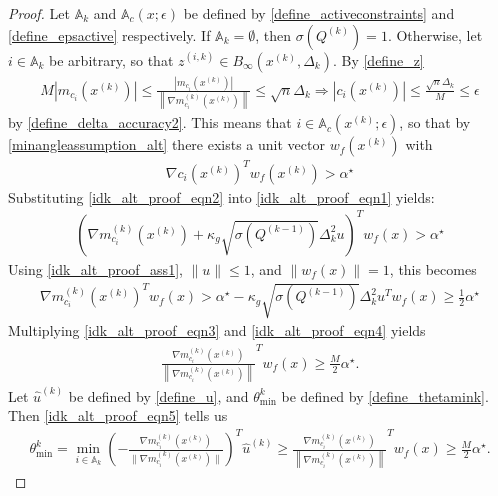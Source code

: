 \documentclass{article}
\theoremstyle{case}
\numberwithin{theorem}{subsection}
\DeclareMathOperator*{\argmin}{arg\,min}
\newcommand{\activeconstraintsk}{{\mathbb A_{k}}}
\newcommand{\dacc}{{\Delta_{\textrm{acc}}}}
\newcommand{\dk}{\Delta_k}
\newcommand{\gmcik}{{\nabla m_{c_i}^{(k)}\left(\xk\right)}}
\newcommand{\hgik}{{\frac{\nabla m^{(k)}_{c_i}(\xk)}{\|\nabla m^{(k)}_{c_i}(\xk)\|}}}
\newcommand{\huk}{{{\hat u}^{(k)}}}
\newcommand{\minanglealpha}{{ \alpha^{\star} }}
\newcommand{\qk}{{Q^{(k)}}}
\newcommand{\thetamink}{{\theta^k_{\textrm{min}}}}
\newcommand{\tr}{{ B_{\infty}\left(\xk, \dk\right) }}
\newcommand{\xk}{{x^{(k)}}}
\newcommand{\zik}{{z^{(i, k)}}}
\newcommand{\minanglediralt}{{w_f}}
\newcommand{\epsactive}{{\mathbb A_c}}
\newcommand{\epsactivemodels}{{\mathbb A_{m}}}
\begin{document}
\begin{proof}
Let $\activeconstraintsk$ and $\epsactive(x; \epsilon)$
be defined by
\cref{define_activeconstraints} and \cref{define_epsactive}
respectively.
If $\activeconstraintsk = \emptyset$, then $\sigma\left(\qk\right) = 1$.
Otherwise, let $i \in \activeconstraintsk$ be arbitrary,
so that $\zik \in \tr$. By \cref{define_z}
\begin{align*}
M \left|m_{c_i}\left(\xk\right)\right| \le \frac{\left|m_{c_i}\left(\xk\right)\right|}{\left\|\gmcik\right\|} \le \sqrt{n} \dk \Longrightarrow
\left|c_i\left(\xk\right)\right| \le \frac{\sqrt{n}\dk}{M} \le \epsilon
\end{align*}
by \cref{define_delta_accuracy2}.
This means that $i \in \epsactive(\xk; \epsilon)$, so that by \cref{minangleassumption_alt} there exists a unit vector $\minanglediralt(\xk)$ with
\begin{align}
\nabla c_i\left(\xk\right)^T\minanglediralt\left(\xk\right) > \minanglealpha \label{idk_alt_proof_eqn1}
\end{align}
Substituting \cref{idk_alt_proof_eqn2} into \cref{idk_alt_proof_eqn1} yields:
\begin{align*}
\left(\gmcik + \kappa_g \sqrt{\sigma\left( Q^{(k-1)} \right)}\dk^2 u\right)^T \minanglediralt(x) > \minanglealpha
\end{align*}
Using \cref{idk_alt_proof_ass1}, $\|u\|\le 1$, and $\|\minanglediralt(x)\| = 1$, this becomes
\begin{align}
\gmcik^T\minanglediralt(x) > \minanglealpha - \kappa_g \sqrt{\sigma\left( Q^{(k-1)} \right)}\dk^2 u^T\minanglediralt(x) \ge \frac 1 2 \minanglealpha \label{idk_alt_proof_eqn3}
\end{align}
Multiplying \cref{idk_alt_proof_eqn3} and \cref{idk_alt_proof_eqn4} yields
\begin{align}
\frac{\gmcik}{\left\|\gmcik\right\|}^T  \minanglediralt(x) \ge \frac M 2 \minanglealpha. \label{idk_alt_proof_eqn5}
\end{align}
Let $\huk$ be defined by \cref{define_u}, 
and $\thetamink$ be defined by \cref{define_thetamink}.
Then \cref{idk_alt_proof_eqn5} tells us 
\begin{align*}
\thetamink = \min_{i \in \activeconstraintsk} \left(-\hgik\right)^T \huk \ge \frac{\gmcik}{\left\|\gmcik\right\|}^T \minanglediralt(x) \ge \frac M 2 \minanglealpha.
\end{align*}


\end{proof}
\end{document}
